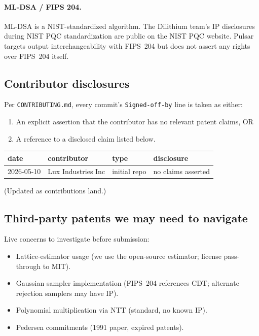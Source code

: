 \paragraph{ML-DSA / FIPS 204.}
ML-DSA is a NIST-standardized algorithm. The Dilithium team's IP
disclosures during NIST PQC standardization are public on the NIST
PQC website. Pulsar targets output interchangeability with
FIPS~204 but does not assert any rights over FIPS~204 itself.

\subsection{Contributor disclosures}

Per \texttt{CONTRIBUTING.md}, every commit's \texttt{Signed-off-by}
line is taken as either:

\begin{enumerate}[leftmargin=*, itemsep=0pt]
\item An explicit assertion that the contributor has no relevant
patent claims, OR
\item A reference to a disclosed claim listed below.
\end{enumerate}

\begin{center}
\begin{tabular}{llll}
\toprule
date & contributor & type & disclosure \\
\midrule
2026-05-10 & Lux Industries Inc & initial repo & no claims asserted \\
\bottomrule
\end{tabular}
\end{center}

(Updated as contributions land.)

\subsection{Third-party patents we may need to navigate}

Live concerns to investigate before submission:

\begin{itemize}[leftmargin=*, itemsep=0pt]
\item Lattice-estimator usage (we use the open-source estimator;
license pass-through to MIT).
\item Gaussian sampler implementation (FIPS~204 references CDT;
alternate rejection samplers may have IP).
\item Polynomial multiplication via NTT (standard, no known IP).
\item Pedersen commitments (1991 paper, expired patents).
\end{itemize}

